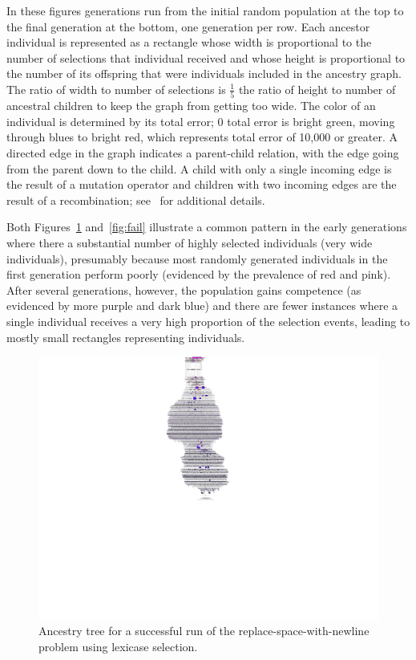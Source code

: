 \documentclass{sig-alternate}
\begin{document}
In these figures generations run from the initial random population at the top to the final generation at the bottom, one generation per row. Each ancestor individual is represented as a rectangle whose width is proportional to the number of selections that individual received and whose height is proportional to the number of its offspring that were individuals included in the ancestry graph. The ratio of width to number of selections is $\frac{1}{5}$ the ratio of height to number of ancestral children to keep the graph from getting too wide. The color of an individual is determined by its total error; 0 total error is bright green, moving through blues to bright red, which represents total error of 10,000 or greater. A directed edge in the graph indicates a parent-child relation, with the edge going from the parent down to the child. A child with only a single incoming edge is the result of a mutation operator and children with two incoming edges are the result of a recombination; see~\cite{Helmuth:2015:dissertation,Spector:2013:GPTP} for additional details.

Both Figures~\ref{fig:success} and~\ref{fig:fail} illustrate a common pattern in the early generations where there a substantial number of highly selected individuals (very wide individuals), presumably because most randomly generated individuals in the first generation perform poorly (evidenced by the prevalence of red and pink). After several generations, however, the population gains competence (as evidenced by more purple and dark blue) and there are fewer instances where a single individual receives a very high proportion of the selection events, leading to mostly small rectangles representing individuals.

\begin{figure}[t]
\centering
\includegraphics[height=0.5 \textheight]{../Figures/output_success.pdf}
\caption{Ancestry tree for a successful run of the replace-space-with-newline problem using lexicase selection.}
\label{fig:success}
\end{figure}
\end{document}
